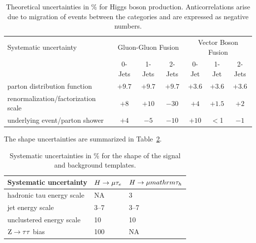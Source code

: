 \documentclass[oneside, letterpaper, oldfontcommands]{memoir}
\begin{document}
{{{\begin{table}[hbtp]
 \centering
  \caption{Theoretical uncertainties in \% for Higgs boson production. Anticorrelations arise due to  migration of events between the categories and are expressed as negative numbers. }
  \label{tab:theory_systematics}
  \begin{tabular}{lccc|ccc} \hline
Systematic uncertainty                  &  \multicolumn{3}{c|}{Gluon-Gluon Fusion} &  \multicolumn{3}{c}{Vector Boson Fusion}  \\ \cline{2-7}
                                &    0-Jets  & 1-Jets  & 2-Jets   & 0-Jet & 1-Jet  & 2-Jets  \\ \hline
parton distribution function         &    $+9.7$  &  $+9.7$ &   $+9.7$ & $+3.6$  &   $+3.6$  &  $+3.6$  \\
renormalization/factorization scale           &    $+8$    &  $+10$   &  $-30$   & $+4$     &   $+1.5$  & $+2$   \\
underlying event/parton shower  &   $+4$     & $-5$   &  $-10$   & $+10$    &   $<$1    & $-1$   \\ \hline
  \end{tabular}

\end{table}
The shape uncertainties are summarized in Table~\ref{tab:shape_systematics}.

\begin{table}[hbtp]
 \centering
  \caption{Systematic uncertainties in \% for the shape of the signal and background templates.}
  \label{tab:shape_systematics}
  {
  \begin{tabular}{lll} \hline
Systematic uncertainty                                 &  $H \rightarrow \mu \mathrm{\tau}_{e}$      &   $H \rightarrow \mu mathrm{\tau_{h}}$                                      \\ \hline
hadronic tau energy scale                              &   NA         &    3                                    \\
jet energy scale                                       &   3--7     &    3--7                                       \\
unclustered energy scale                                &   10      &    10                                   \\
$\mathrm{Z} \rightarrow \mathrm{\tau}\mathrm{\tau}$ bias                                 &   100 &     NA                                          \\   \hline
  \end{tabular}
}


\end{table}}}}
\end{document}
